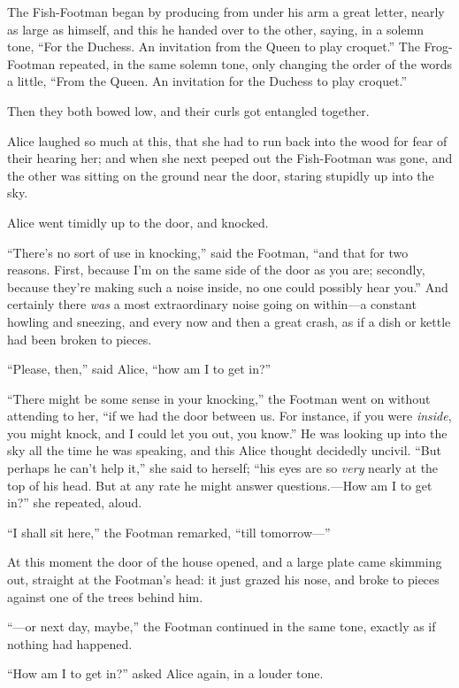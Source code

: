 \documentclass[book, 20pt]{extbook}
\begin{document}
The Fish-Footman began by producing from under his arm a great letter,
nearly as large as himself, and this he handed over to the other,
saying, in a solemn tone, ``For the Duchess. An invitation from the
Queen to play croquet.'' The Frog-Footman repeated, in the same solemn
tone, only changing the order of the words a little, ``From the Queen.
An invitation for the Duchess to play croquet.''

Then they both bowed low, and their curls got entangled together.

Alice laughed so much at this, that she had to run back into the wood
for fear of their hearing her; and when she next peeped out the
Fish-Footman was gone, and the other was sitting on the ground near the
door, staring stupidly up into the sky.

Alice went timidly up to the door, and knocked.

``There's no sort of use in knocking,'' said the Footman, ``and that for
two reasons. First, because I'm on the same side of the door as you are;
secondly, because they're making such a noise inside, no one could
possibly hear you.'' And certainly there \emph{was} a most extraordinary
noise going on within---a constant howling and sneezing, and every now
and then a great crash, as if a dish or kettle had been broken to
pieces.

``Please, then,'' said Alice, ``how am I to get in?''

``There might be some sense in your knocking,'' the Footman went on
without attending to her, ``if we had the door between us. For instance,
if you were \emph{inside}, you might knock, and I could let you out, you
know.'' He was looking up into the sky all the time he was speaking, and
this Alice thought decidedly uncivil. ``But perhaps he can't help it,''
she said to herself; ``his eyes are so \emph{very} nearly at the top of
his head. But at any rate he might answer questions.---How am I to get
in?'' she repeated, aloud.

``I shall sit here,'' the Footman remarked, ``till tomorrow---''

At this moment the door of the house opened, and a large plate came
skimming out, straight at the Footman's head: it just grazed his nose,
and broke to pieces against one of the trees behind him.

``---or next day, maybe,'' the Footman continued in the same tone,
exactly as if nothing had happened.

``How am I to get in?'' asked Alice again, in a louder tone.
\end{document}
